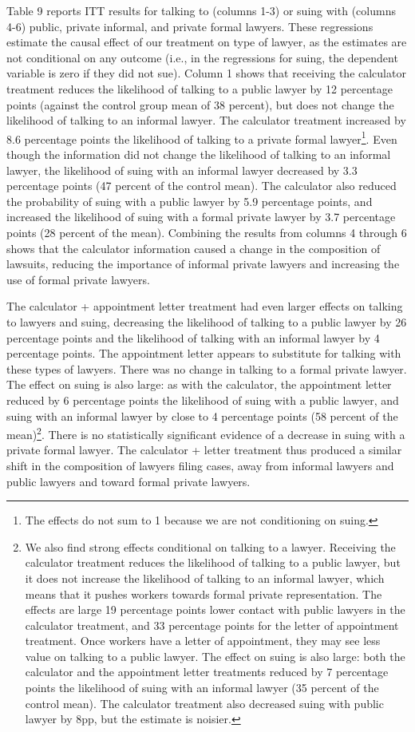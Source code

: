 \documentclass[oneside,12pt]{article}
\begin{document}
Table 9 reports ITT results for talking to (columns 1-3) or suing with (columns 4-6) public, private informal, and private formal lawyers. These regressions estimate the causal effect of our treatment on type of lawyer, as the estimates are not conditional on any outcome (i.e., in the regressions for suing, the dependent variable is zero if they did not sue). Column 1 shows that receiving the calculator treatment reduces the likelihood of talking to a public lawyer by 12 percentage points (against the control group mean of 38 percent), but does not change the likelihood of talking to an informal lawyer. The calculator treatment increased by 8.6 percentage points the likelihood of talking to a private formal lawyer\footnote{The effects do not sum to 1 because we are not conditioning on suing.}.  Even though the information did not change the likelihood of talking to an informal lawyer, the likelihood of suing with an informal lawyer decreased by 3.3 percentage points (47 percent of the control mean). The calculator also reduced the probability of suing with a public lawyer by 5.9 percentage points, and increased the likelihood of suing with a formal private lawyer by 3.7 percentage points (28 percent of the mean). Combining the results from columns 4 through 6 shows that the calculator information caused a change in the composition of lawsuits, reducing the importance of informal private lawyers and increasing the use of formal private lawyers. 

The calculator + appointment letter treatment had even larger effects on talking to lawyers and suing, decreasing the likelihood of talking to a public lawyer by 26 percentage points and the likelihood of talking with an informal lawyer by 4 percentage points. The appointment letter appears to substitute for talking with these types of lawyers. There was no change in talking to a formal private lawyer. The effect on suing is also large: as with the calculator, the appointment letter reduced by 6 percentage points the likelihood of suing with a public lawyer, and suing with an informal lawyer by close to 4 percentage points (58 percent of the mean)\footnote{We also find strong effects conditional on talking to a lawyer. Receiving the calculator treatment reduces the likelihood of talking to a public lawyer, but it does not increase the likelihood of talking to an informal lawyer, which means that it pushes workers towards formal private representation. The effects are large 19 percentage points lower contact with public lawyers in the calculator treatment, and 33 percentage points for the letter of appointment treatment. Once workers have a letter of appointment, they may see less value on talking to a public lawyer. The effect on suing is also large: both the calculator and the appointment letter treatments reduced by 7 percentage points the likelihood of suing with an informal lawyer (35 percent of the control mean). The calculator treatment also decreased suing with public lawyer by 8pp, but the estimate is noisier.}.  There is no statistically significant evidence of a decrease in suing with a private formal lawyer. The calculator + letter treatment thus produced a similar shift in the composition of lawyers filing cases, away from informal lawyers and public lawyers and toward formal private lawyers.
\end{document}
